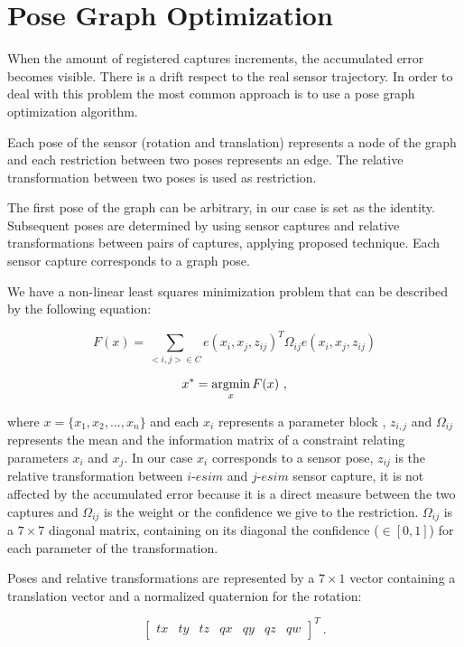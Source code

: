 \section{Pose Graph Optimization}
\label{sec:posegraph}
When the amount of registered captures increments, the accumulated error 
becomes visible. There is a drift respect to the real sensor trajectory. 
In order to deal with this problem the most common approach is to use a pose graph 
optimization algorithm. 


Each pose of the sensor (rotation and translation) represents a node of the 
graph and each restriction between two poses represents an edge. The relative 
transformation between two poses is used as restriction.


The first pose of the graph can be arbitrary, in our case is set as the identity. Subsequent 
poses are determined by using sensor captures and relative transformations between pairs of captures, applying 
proposed technique. Each sensor capture corresponds to a graph pose. 

We have a non-linear least squares minimization problem that can be described by the following equation:

$$ F(x) = \sum\limits_{<i,j> \in C } e(x_i,x_j,z_{ij})^T \Omega_{ij} e(x_i,x_j,z_{ij}) $$

$$ x^* = \mathop{\rm argmin}_x F(x) \ ,$$

\noindent where $x=\{x_1,x_2,...,x_n\}$ and each $x_i$ represents a parameter block , $z_{i,j}$ and $\Omega_{ij}$ represents the mean  
 and the information matrix  of a constraint 
relating parameters $x_i$ and $x_j$. In our case $x_i$ corresponds to a sensor pose, $z_{ij}$ is the 
relative transformation between $i$-$esim$ and $j$-$esim$ sensor capture, it is not affected by the accumulated error 
because it is a direct measure between the two captures and $\Omega_{ij}$ is the weight or 
the confidence we give to the restriction. $\Omega_{ij}$ is a $7\times7$ diagonal matrix, containing on its diagonal the confidence ($\in [0,1]$) for each 
parameter of the transformation. 

Poses and relative transformations are represented by a $7\times1$ vector containing a translation vector
 and a normalized quaternion for the rotation:

$$ \begin{bmatrix} tx & ty & tz & qx & qy & qz & qw \end{bmatrix} ^T \ .$$



